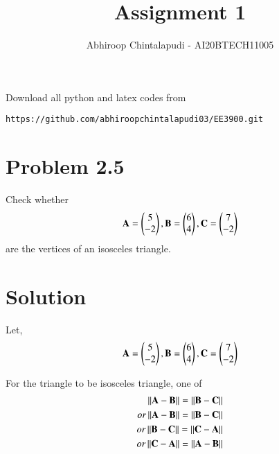 \documentclass[journal,12pt,twocolumn]{IEEEtran}
\begin{document}
     \def\rightbox#1{\makebox[0in][r]{#1}}
     \def\centbox#1{\makebox[0in]{#1}}
     \def\topbox#1{\raisebox{-\baselineskip}[0in][0in]{#1}}
     \def\midbox#1{\raisebox{-0.5\baselineskip}[0in][0in]{#1}}
\vspace{3cm}
\title{Assignment 1}
\author{Abhiroop Chintalapudi - AI20BTECH11005}
\maketitle
\newpage
\bigskip
\renewcommand{\thefigure}{\theenumi}
\renewcommand{\thetable}{\theenumi}
Download all python and latex codes from 
\begin{lstlisting}
https://github.com/abhiroopchintalapudi03/EE3900.git
\end{lstlisting}

\section{Problem 2.5}
Check whether\\
\begin{align}
\mathbf{A}=\begin{pmatrix}5 \\ -2\end{pmatrix}, \mathbf{B}=\begin{pmatrix}6 \\ 4\end{pmatrix}, \mathbf{C}=\begin{pmatrix}7 \\ -2 \end{pmatrix}\label{eq:2.5.1}
\end{align}
are the vertices of an isosceles triangle.

\section{Solution}
Let,\\
\begin{align}
\mathbf{A}=\begin{pmatrix}5 \\ -2\end{pmatrix}, \mathbf{B}=\begin{pmatrix}6 \\ 4\end{pmatrix}, \mathbf{C}=\begin{pmatrix}7 \\ -2 \end{pmatrix}\label{eq:2.5.2}
\end{align}

For the triangle to be isosceles triangle, one of\\
\begin{align}
	\left\lVert\mathbf{A} - \mathbf{B}\right\rVert =  \left\lVert\mathbf{B} - \mathbf{C}\right\rVert \label{eq:2.5.3}\\
	or \left\lVert\mathbf{A} - \mathbf{B}\right\rVert =  \left\lVert\mathbf{B} - \mathbf{C}\right\rVert \label{eq:2.5.4}\\
	or \left\lVert\mathbf{B} - \mathbf{C}\right\rVert =  \left\lVert\mathbf{C} - \mathbf{A}\right\rVert \label{eq:2.5.5}\\
	or \left\lVert\mathbf{C} - \mathbf{A}\right\rVert =  \left\lVert\mathbf{A} - \mathbf{B}\right\rVert \label{eq:2.5.6}
\end{align}
\end{document}

